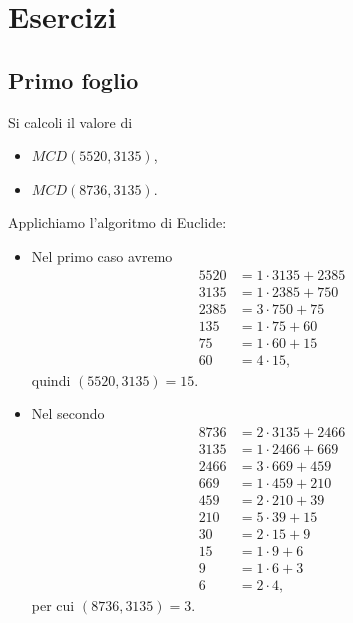 \chapter{Esercizi}
%
%
\section{Primo foglio}

\setcounter{exeN}{0}

\begin{exeN}\label{ex:1.1}
	Si calcoli il valore di
	\begin{itemize}
		\item \(MCD(5520,3135)\),
		\item \(MCD(8736,3135)\).
	\end{itemize}
\end{exeN}

\begin{sol}
	Applichiamo l'algoritmo di Euclide:
	\begin{itemize}
		\item Nel primo caso avremo
		      \begin{align*}
			      5520 & = 1\cdot3135+2385 \\
			      3135 & = 1\cdot2385+750  \\
			      2385 & = 3\cdot750+75    \\
			      135  & = 1\cdot75+60     \\
			      75   & = 1\cdot60+15     \\
			      60   & = 4\cdot15,
		      \end{align*}
		      quindi \((5520,3135)=15\).
		\item Nel secondo
		      \begin{align*}
			      8736 & = 2\cdot3135+2466 \\
			      3135 & = 1\cdot2466+669  \\
			      2466 & = 3\cdot669+459   \\
			      669  & = 1\cdot459+210   \\
			      459  & = 2\cdot210+39    \\
			      210  & = 5\cdot39+15     \\
			      30   & = 2\cdot15+9      \\
			      15   & = 1\cdot9+6       \\
			      9    & = 1\cdot6+3       \\
			      6    & =2\cdot4,
		      \end{align*}
		      per cui \((8736,3135)=3\).
	\end{itemize}
\end{sol}

